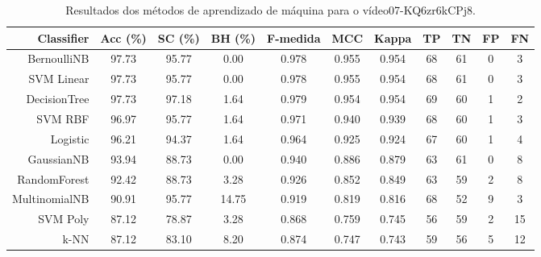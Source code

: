 \begin{table}[!htb]
\centering
\caption{Resultados dos métodos de aprendizado de máquina para o vídeo07-KQ6zr6kCPj8.}
\label{tab:07-KQ6zr6kCPj8}
\begin{tabular}{r|c|c|c|c|c|c|c|c|c|c}
\hline\hline
Classifier & Acc (\%) & SC (\%) & BH (\%) & F-medida & MCC & Kappa & TP & TN & FP & FN \\ \hline
BernoulliNB & 97.73 & 95.77 & 0.00 & 0.978 & 0.955 & 0.954 & 68 & 61 & 0 & 3 \\ 
SVM Linear & 97.73 & 95.77 & 0.00 & 0.978 & 0.955 & 0.954 & 68 & 61 & 0 & 3 \\ 
DecisionTree & 97.73 & 97.18 & 1.64 & 0.979 & 0.954 & 0.954 & 69 & 60 & 1 & 2 \\ 
SVM RBF & 96.97 & 95.77 & 1.64 & 0.971 & 0.940 & 0.939 & 68 & 60 & 1 & 3 \\ 
Logistic & 96.21 & 94.37 & 1.64 & 0.964 & 0.925 & 0.924 & 67 & 60 & 1 & 4 \\ 
GaussianNB & 93.94 & 88.73 & 0.00 & 0.940 & 0.886 & 0.879 & 63 & 61 & 0 & 8 \\ 
RandomForest & 92.42 & 88.73 & 3.28 & 0.926 & 0.852 & 0.849 & 63 & 59 & 2 & 8 \\ 
MultinomialNB & 90.91 & 95.77 & 14.75 & 0.919 & 0.819 & 0.816 & 68 & 52 & 9 & 3 \\ 
SVM Poly & 87.12 & 78.87 & 3.28 & 0.868 & 0.759 & 0.745 & 56 & 59 & 2 & 15 \\ 
k-NN & 87.12 & 83.10 & 8.20 & 0.874 & 0.747 & 0.743 & 59 & 56 & 5 & 12 \\ 
\hline\hline
\end{tabular}
\end{table}
